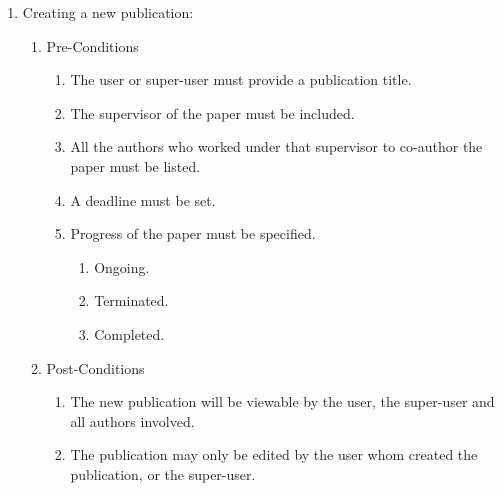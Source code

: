 \documentclass[10pt,a4paper]{exam}
\begin{document}
\noindent 
\begin{enumerate}
\item  Creating a new publication:

\begin{enumerate}
\item  Pre-Conditions

\begin{enumerate}
\item  The user or super-user must provide a publication title.

\item  The supervisor of the paper must be included.

\item  All the authors who worked under that supervisor to co-author the paper must be listed.

\item  A deadline must be set.

\item  Progress of the paper must be specified.

\begin{enumerate}
\item  Ongoing.

\item  Terminated.

\item  Completed.
\end{enumerate}
\end{enumerate}

\item  Post-Conditions

\begin{enumerate}
\item  The new publication will be viewable by the user, the super-user and all authors involved.

\item  The publication may only be edited by the user whom created the publication, or the super-user.
\end{enumerate}
\end{enumerate}
\end{enumerate}

\noindent 
\end{document}
